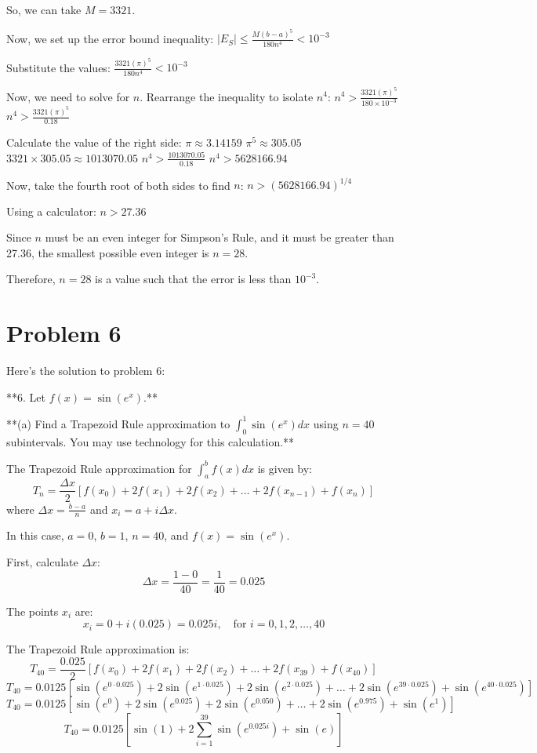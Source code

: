 \documentclass{article}
\begin{document}
So, we can take $M = 3321$.

Now, we set up the error bound inequality:
$|E_S| \le \frac{M(b-a)^5}{180n^4} < 10^{-3}$

Substitute the values:
$\frac{3321(\pi)^5}{180n^4} < 10^{-3}$

Now, we need to solve for $n$. Rearrange the inequality to isolate $n^4$:
$n^4 > \frac{3321(\pi)^5}{180 \times 10^{-3}}$
$n^4 > \frac{3321(\pi)^5}{0.18}$

Calculate the value of the right side:
$\pi \approx 3.14159$
$\pi^5 \approx 305.05$
$3321 \times 305.05 \approx 1013070.05$
$n^4 > \frac{1013070.05}{0.18}$
$n^4 > 5628166.94$

Now, take the fourth root of both sides to find $n$:
$n > (5628166.94)^{1/4}$

Using a calculator:
$n > 27.36$

Since $n$ must be an even integer for Simpson's Rule, and it must be greater than 27.36, the smallest possible even integer is $n=28$.

Therefore, $n=28$ is a value such that the error is less than $10^{-3}$.

\newpage

\section*{Problem 6}
Here's the solution to problem 6:

**6. Let $f(x) = \sin(e^x)$.**

**(a) Find a Trapezoid Rule approximation to $\int_0^1 \sin(e^x) dx$ using $n = 40$ subintervals. You may use technology for this calculation.**

The Trapezoid Rule approximation for $\int_a^b f(x) dx$ is given by:
$$T_n = \frac{\Delta x}{2} [f(x_0) + 2f(x_1) + 2f(x_2) + \dots + 2f(x_{n-1}) + f(x_n)]$$
where $\Delta x = \frac{b-a}{n}$ and $x_i = a + i\Delta x$.

In this case, $a=0$, $b=1$, $n=40$, and $f(x) = \sin(e^x)$.

First, calculate $\Delta x$:
$$\Delta x = \frac{1 - 0}{40} = \frac{1}{40} = 0.025$$

The points $x_i$ are:
$$x_i = 0 + i(0.025) = 0.025i, \quad \text{for } i = 0, 1, 2, \dots, 40$$

The Trapezoid Rule approximation is:
$$T_{40} = \frac{0.025}{2} [f(x_0) + 2f(x_1) + 2f(x_2) + \dots + 2f(x_{39}) + f(x_{40})]$$
$$T_{40} = 0.0125 [\sin(e^{0 \cdot 0.025}) + 2\sin(e^{1 \cdot 0.025}) + 2\sin(e^{2 \cdot 0.025}) + \dots + 2\sin(e^{39 \cdot 0.025}) + \sin(e^{40 \cdot 0.025})]$$
$$T_{40} = 0.0125 [\sin(e^0) + 2\sin(e^{0.025}) + 2\sin(e^{0.050}) + \dots + 2\sin(e^{0.975}) + \sin(e^1)]$$
$$T_{40} = 0.0125 [\sin(1) + 2\sum_{i=1}^{39} \sin(e^{0.025i}) + \sin(e)]$$
\end{document}

